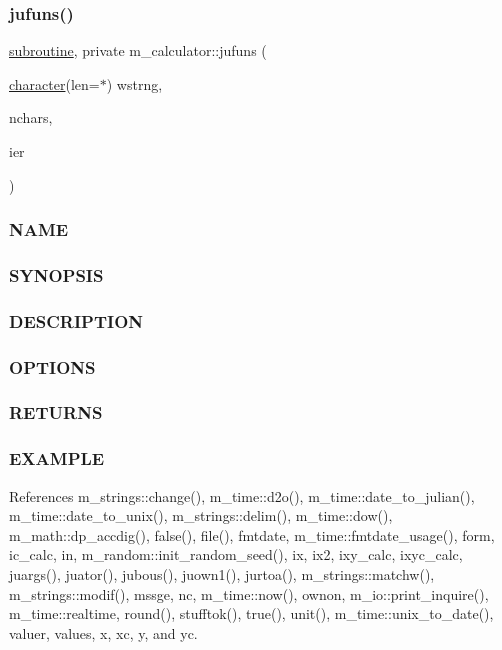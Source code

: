 \subsubsection{\texorpdfstring{jufuns()}{jufuns()}}
{\footnotesize\ttfamily \hyperlink{M__stopwatch_83_8txt_acfbcff50169d691ff02d4a123ed70482}{subroutine}, private m\+\_\+calculator\+::jufuns (\begin{DoxyParamCaption}\item[{\hyperlink{option__stopwatch_83_8txt_abd4b21fbbd175834027b5224bfe97e66}{character}(len=$\ast$)}]{wstrng,  }\item[{}]{nchars,  }\item[{}]{ier }\end{DoxyParamCaption})\hspace{0.3cm}{\ttfamily [private]}}



\subsubsection*{N\+A\+ME}

\subsubsection*{S\+Y\+N\+O\+P\+S\+IS}

\subsubsection*{D\+E\+S\+C\+R\+I\+P\+T\+I\+ON}

\subsubsection*{O\+P\+T\+I\+O\+NS}

\subsubsection*{R\+E\+T\+U\+R\+NS}

\subsubsection*{E\+X\+A\+M\+P\+LE}

References m\+\_\+strings\+::change(), m\+\_\+time\+::d2o(), m\+\_\+time\+::date\+\_\+to\+\_\+julian(), m\+\_\+time\+::date\+\_\+to\+\_\+unix(), m\+\_\+strings\+::delim(), m\+\_\+time\+::dow(), m\+\_\+math\+::dp\+\_\+accdig(), false(), file(), fmtdate, m\+\_\+time\+::fmtdate\+\_\+usage(), form, ic\+\_\+calc, in, m\+\_\+random\+::init\+\_\+random\+\_\+seed(), ix, ix2, ixy\+\_\+calc, ixyc\+\_\+calc, juargs(), juator(), jubous(), juown1(), jurtoa(), m\+\_\+strings\+::matchw(), m\+\_\+strings\+::modif(), mssge, nc, m\+\_\+time\+::now(), ownon, m\+\_\+io\+::print\+\_\+inquire(), m\+\_\+time\+::realtime, round(), stufftok(), true(), unit(), m\+\_\+time\+::unix\+\_\+to\+\_\+date(), valuer, values, x, xc, y, and yc.

